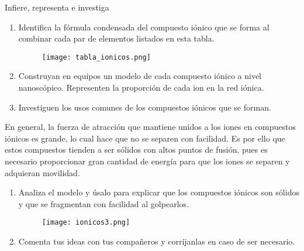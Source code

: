 \begin{boxK}
    Infiere, representa e investiga
    \begin{enumerate}
        \item Identifica la fórmula condensada del compuesto iónico que se forma al combinar cada par
              de elementos listados en esta tabla.
              \begin{figure}[H]
                  \centering
                  \texttt{[image: tabla\_ionicos.png]}
                  \label{fig:tabla_ionicos}
              \end{figure}
        \item Construyan en equipos un modelo de cada compuesto iónico a nivel nanoscópico. Representen la proporción de cada ion en la red iónica.
        \item Investiguen los usos comunes de los compuestos iónicos que se forman.
    \end{enumerate}
\end{boxK}

En general, la fuerza de atracción que mantiene unidos a los iones en compuestos iónicos es grande,
lo cual hace que no se separen con facilidad. Es por ello que estos compuestos tienden a ser sólidos
con altos puntos de fusión, pues es necesario proporcionar gran cantidad de energía para que los
iones se separen y adquieran movilidad.

\begin{boxK}
    \begin{enumerate}
        \item  Analiza el modelo y úsalo para explicar que los compuestos iónicos son sólidos y que se fragmentan con facilidad al golpearlos.
              \begin{figure}[H]
                  \centering
                  \texttt{[image: ionicos3.png]}
                  \label{fig:ionicos3}
              \end{figure}
        \item Comenta tus ideas con tus compañeros y corríjanlas en caso de ser necesario.
    \end{enumerate}
\end{boxK}


